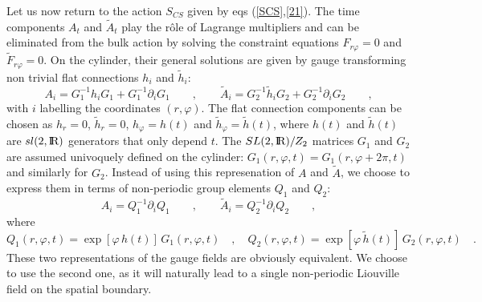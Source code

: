 \documentclass[a4paper,10pt]{article}
\begin{document}
Let us now return to the action $S_{CS}$ given by eqs (\ref{SCS},\ref{21}). 
The time components $A_t$ and $\tilde A_t $ play the r\^ole of  
Lagrange multipliers and can be 
eliminated from the bulk action by solving the constraint equations  
$F_{r\varphi} = 0$ and $\tilde F_{r\varphi} = 0$. On the cylinder, 
their general 
solutions \cite{EMSS}
are given by gauge transforming non trivial flat connections 
$h_i$ and $\tilde h_i$: 
\begin{equation} 
\label{DEFHO1} 
 A_i =  G^{-1}_1 h_i  G_1 + G^{-1}_1 \partial_i G_1   \qquad , \qquad
\tilde A_i =  G^{-1}_2 \tilde h_i  G_2 + G^{-1}_2 \partial_i G_2   \qquad ,  
\end{equation} 
with $i$ labelling the coordinates $(r, \varphi)$. 
The flat connection components can be chosen as 
$h_r=0$, $\tilde h_r=0$, $h_\varphi= h(t)$ and 
$\tilde h_\varphi= \tilde h(t)$, where $h(t)$ and  
$\tilde h(t)$ 
are $sl(2,{\hbox{{\rm I}\kern-.2em\hbox{\rm R}}})$ generators that only depend $t$. The $SL(2,{\hbox{{\rm I}\kern-.2em\hbox{\rm R}}})/Z_2$ 
matrices $G_1$ 
and $G_2$ are assumed univoquely defined on the cylinder:  
$G_1(r,\varphi,t)= G_1(r,\varphi+2\pi,t)$  and similarly for $G_2$.  
Instead of using this represenation of $A$ and $\tilde A$, we choose 
to express them in terms of non-periodic group elements  
$Q_1$ and $Q_2$: 
\begin{equation} 
\label{AQ1} 
A_i = Q^{-1}_1 \partial_i Q_1 \qquad , \qquad   
\tilde A_i = Q^{-1}_2 \partial_{i} Q_2 \qquad , 
\end{equation} 
where 
\begin{equation} 
\label{G1} 
Q_1(r,\varphi,t)=\exp[\varphi \, h(t)]\, G_1(r,\varphi,t) 
\quad , \quad  
Q_2(r,\varphi,t)=\exp[\varphi \, \tilde h(t)]\, 
 G_2(r,\varphi,t) 
\quad . 
\end{equation} 
These two representations of the gauge fields are obviously equivalent. 
We choose to use the second one, as it will naturally lead to a 
single  non-periodic Liouville field on 
the spatial boundary.
 
\end{document}
